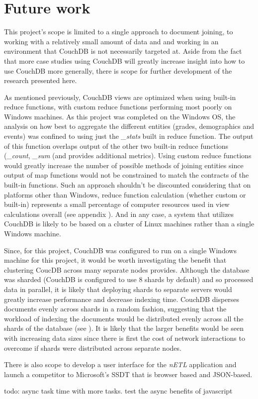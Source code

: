 \section{Future work}
This project's scope is limited to a single approach to document joining, to working with a relatively small amount of data and and working in an environment that CouchDB is not necessarily targeted at. Aside from the fact that more case studies using CouchDB will greatly increase insight into how to use CouchDB more generally, there is scope for further development of the research presented here.

As mentioned previously, CouchDB views are optimized when using built-in reduce functions, with custom reduce functions performing most poorly on Windows machines. As this project was completed on the Windows OS, the analysis on how best to aggregate the different entities (grades, demographics and events) was confined to using just the \textit{\_stats} built in reduce function. The output of this function overlaps output of the other two built-in reduce functions (\textit{\_count}, \textit{\_sum} (and provides additional metrics). Using custom reduce functions would greatly increase the number of possible methods of joining entities since output of map functions would not be constrained to match the contracts of the built-in functions. Such an approach shouldn't be discounted considering that on platforms other than Windows, reduce function calculation (whether custom or built-in) represents a small percentage of computer resources used in view calculations overall (see appendix \cite{slack1Nov}). And in any case, a system that utilizes CouchDB is likely to be based on a cluster of Linux machines rather than a single Windows machine.

Since, for this project, CouchDB was configured to run on a single Windows machine for this project, it would be worth investigating the benefit that clustering CoucDB across many separate nodes provides. Although the database was sharded (CouchDB is configured to use 8 shards by default) and so processed data in parallel, it is likely that deploying shards to separate servers would greatly increase performance and decrease indexing time. CouchDB disperses documents evenly across shards in a random fashion, suggesting that the workload of indexing the documents would be distributed evenly across all the shards of the database (see \cite{slack7Nov}). It is likely that the larger benefits would be seen with increasing data sizes since there is first the cost of network interactions to overcome if shards were distributed across separate nodes.

There is also scope to develop a user interface for the \textit{nETL} application and launch a competitor to Microsoft's SSDT that is browser based and JSON-based.


todo: async task time with more tasks. test the async benefits of javascript